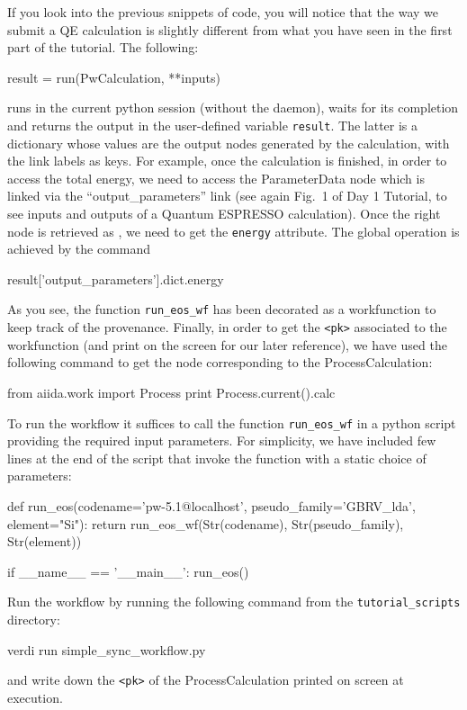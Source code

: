 If you look into the previous snippets of code, you will notice that the way we submit a QE calculation is slightly different from what you have seen in the first part of the tutorial.  The following:
\begin{pythoncommand}
result = run(PwCalculation, **inputs)
\end{pythoncommand}
runs in the current python session (without the daemon), waits for its completion and returns the output in the user-defined variable \texttt{result}.
The latter is a dictionary whose values are the output nodes generated by the calculation, with the link labels as keys.
For example, once the calculation is finished, in order to access the total energy, we need to access the ParameterData node which is linked via the ``output\_parameters'' link (see again Fig.~1 of Day 1 Tutorial, to see inputs and outputs of a Quantum ESPRESSO calculation).
Once the right node is retrieved as , we need to get the \texttt{energy} attribute. The global operation is achieved by the command
\begin{pythoncommand}
result['output_parameters'].dict.energy
\end{pythoncommand}
As you see, the function \texttt{run\_eos\_wf} has been decorated as a workfunction to keep track of the provenance.
Finally, in order to get the \texttt{<pk>} associated to the workfunction (and print on the screen for our later reference), we have used the following command to get the node corresponding to the ProcessCalculation:
\begin{pythoncommand}
from aiida.work import Process
print Process.current().calc
\end{pythoncommand}

To run the workflow it suffices to call the function \texttt{run\_eos\_wf} in a python script providing the required input parameters. For simplicity, we have included few lines at the end of the script that invoke the function with a static choice of parameters: 

\begin{pythoncommand}
def run_eos(codename='pw-5.1@localhost', pseudo_family='GBRV_lda', element="Si"):
    return run_eos_wf(Str(codename), Str(pseudo_family), Str(element))

if __name__ == '__main__':
    run_eos() 
\end{pythoncommand}

\begin{tcolorbox}
Run the workflow by running the following command from the \texttt{tutorial\_scripts} directory:
\begin{bashcommand}
verdi run simple_sync_workflow.py
\end{bashcommand}
and write down the \texttt{<pk>} of the ProcessCalculation printed on screen at execution.
\end{tcolorbox}

